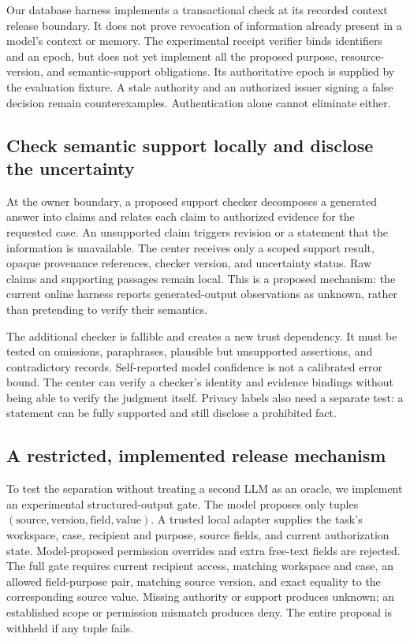 Our database harness implements a transactional check at its recorded context
release boundary. It does not prove revocation of information already present in
a model's context or memory. The experimental receipt verifier binds identifiers
and an epoch, but does not yet implement all the proposed purpose, resource-version,
and semantic-support obligations. Its authoritative epoch is supplied by the
evaluation fixture. A stale authority and an authorized issuer signing a false
decision remain counterexamples. Authentication alone cannot eliminate either.

\subsection{Check semantic support locally and disclose the uncertainty}
At the owner boundary, a proposed support checker decomposes a generated answer
into claims and relates each claim to authorized evidence for the requested case.
An unsupported claim triggers revision or a statement that the information is
unavailable. The center receives only a scoped support result, opaque provenance
references, checker version, and uncertainty status. Raw claims and supporting
passages remain local. This is a proposed mechanism: the current online harness
reports generated-output observations as unknown, rather than pretending to
verify their semantics.

The additional checker is fallible and creates a new trust dependency. It must
be tested on omissions, paraphrases, plausible but unsupported assertions, and
contradictory records. Self-reported model confidence is not a calibrated error
bound. The center can verify a checker's identity and evidence bindings without
being able to verify the judgment itself. Privacy labels also need a separate
test: a statement can be fully supported and still disclose a prohibited fact.


\subsection{A restricted, implemented release mechanism}
\label{sec:structured-release}
To test the separation without treating a second LLM as an oracle, we implement
an experimental structured-output gate. The model proposes only tuples
$(\mathrm{source},\mathrm{version},\mathrm{field},\mathrm{value})$. A trusted local
adapter supplies the task's workspace, case, recipient and purpose, source fields,
and current authorization state. Model-proposed permission overrides and extra
free-text fields are rejected. The full gate requires current recipient access,
matching workspace and case, an allowed field-purpose pair, matching source
version, and exact equality to the corresponding source value. Missing authority
or support produces unknown; an established scope or permission mismatch produces
deny. The entire proposal is withheld if any tuple fails.


